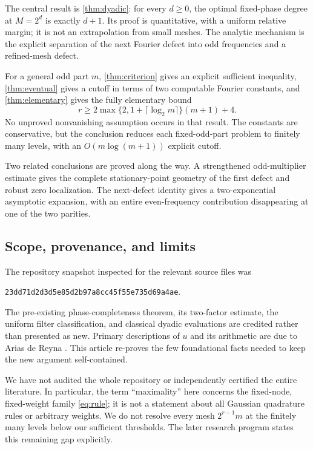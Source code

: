 \documentclass[11pt,a4paper]{article}
\numberwithin{equation}{section}
\theoremstyle{plain}
\theoremstyle{definition}
\theoremstyle{remark}
\begin{document}
The central result is \cref{thm:dyadic}: for every $d\ge0$, the optimal
fixed-phase degree at $M=2^d$ is exactly $d+1$. Its proof is quantitative,
with a uniform relative margin; it is not an extrapolation from small
meshes. The analytic mechanism is the explicit separation of the next
Fourier defect into odd frequencies and a refined-mesh defect.

For a general odd part $m$, \cref{thm:criterion} gives an explicit sufficient
inequality, \cref{thm:eventual} gives a cutoff in terms of two computable
Fourier constants, and \cref{thm:elementary} gives the fully elementary bound
\begin{equation}\label{eq:elementary-intro}
 r\ge2\max\{2,1+\lceil\log_2m\rceil\}(m+1)+4.
\end{equation}
No unproved nonvanishing assumption occurs in that result. The constants
are conservative, but the conclusion reduces each fixed-odd-part problem
to finitely many levels, with an $O(m\log(m+1))$ explicit cutoff.

Two related conclusions are proved along the way. A strengthened
odd-multiplier estimate gives the complete stationary-point geometry of
the first defect and robust zero localization. The next-defect identity
gives a two-exponential asymptotic expansion, with an entire even-frequency
contribution disappearing at one of the two parities.

\subsection{Scope, provenance, and limits}

The repository snapshot inspected for the relevant source files was
\begin{center}\small
\texttt{23dd71d2d3d5e85d2b97a8cc45f55e735d69a4ae}.
\end{center}
The pre-existing phase-completeness theorem, its two-factor estimate, the
uniform filter classification, and classical dyadic evaluations are credited
rather than presented as new. Primary descriptions of $u$ and its arithmetic
are due to Arias de Reyna \cite{arias1982,arias2017}. This article re-proves
the few foundational facts needed to keep the new argument self-contained.

We have not audited the whole repository or independently certified the
entire literature. In particular, the term ``maximality'' here concerns the
fixed-node, fixed-weight family \eqref{eq:rule}; it is not a statement about
all Gaussian quadrature rules or arbitrary weights. We do not resolve every
mesh $2^{r-1}m$ at the finitely many levels below our sufficient thresholds.
The later research program states this remaining gap explicitly.
\end{document}
